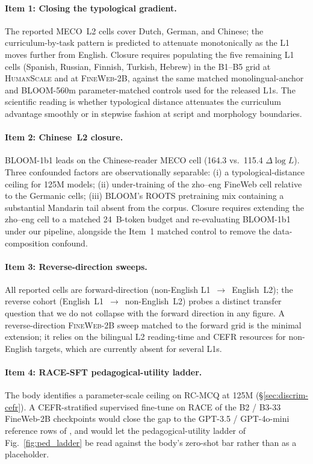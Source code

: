 \paragraph{Item 1: Closing the typological gradient.} The reported MECO~L2 cells cover Dutch, German, and Chinese; the curriculum-by-task pattern is predicted to attenuate monotonically as the L1 moves further from English. Closure requires populating the five remaining L1 cells (Spanish, Russian, Finnish, Turkish, Hebrew) in the B1--B5 grid at \textsc{HumanScale} and at \textsc{FineWeb-2B}, against the same matched monolingual-anchor and BLOOM-560m parameter-matched controls used for the released L1s. The scientific reading is whether typological distance attenuates the curriculum advantage smoothly or in stepwise fashion at script and morphology boundaries.

\paragraph{Item 2: Chinese~L2 closure.} BLOOM-1b1 leads \beetle{} on the Chinese-reader MECO cell (164.3 vs.\ 115.4 $\Delta\log L$). Three confounded factors are observationally separable: (i) a typological-distance ceiling for 125M models; (ii) under-training of the zho--eng FineWeb cell relative to the Germanic cells; (iii) BLOOM's ROOTS pretraining mix containing a substantial Mandarin tail absent from the \beetle{} corpus. Closure requires extending the zho--eng cell to a matched 24~B-token budget and re-evaluating BLOOM-1b1 under our pipeline, alongside the Item~1 matched control to remove the data-composition confound.

\paragraph{Item 3: Reverse-direction sweeps.} All reported cells are forward-direction (non-English L1~$\to$~English~L2); the reverse cohort (English~L1~$\to$~non-English~L2) probes a distinct transfer question that we do not collapse with the forward direction in any figure. A reverse-direction \textsc{FineWeb-2B} sweep matched to the forward grid is the minimal extension; it relies on the bilingual L2 reading-time and CEFR resources for non-English targets, which are currently absent for several L1s.

\paragraph{Item 4: RACE-SFT pedagogical-utility ladder.} The body identifies a parameter-scale ceiling on RC-MCQ at 125M (\S\ref{sec:discrim-cefr}). A CEFR-stratified supervised fine-tune on RACE \citep{lai-etal-2017-race} of the B2 / B3-33 FineWeb-2B checkpoints would close the gap to the GPT-3.5 / GPT-4o-mini reference rows of \citet{benedetto-etal-2024-using}, and would let the pedagogical-utility ladder of Fig.~\ref{fig:ped_ladder} be read against the body's zero-shot bar rather than as a placeholder.

